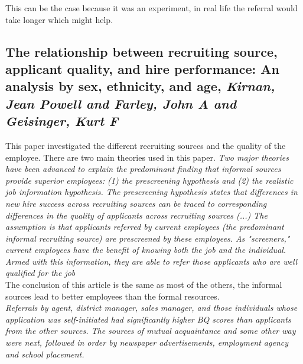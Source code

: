\documentclass[a4paper, 11pt]{article} %
\begin{document}
This can be the case because it was an experiment, in real life the referral would take longer which might help.


\subsection*{The relationship between recruiting source, applicant quality, and hire performance: An analysis by sex, ethnicity, and age, 
\emph{Kirnan, Jean Powell and Farley, John A and Geisinger, Kurt F} \cite{tenth}}

This paper investigated the different recruiting sources and the quality of the employee. 
There are two main theories used in this paper.
\emph{Two major theories have been advanced to explain the predominant
finding that informal sources provide superior employees: (1) the prescreening hypothesis and (2) the realistic job information hypothesis. The
prescreening hypothesis states that differences in new hire success across
recruiting sources can be traced to corresponding differences in the quality
of applicants across recruiting sources (...) The assumption is that applicants referred by current employees (the predominant informal recruiting source) are prescreened by these
employees. As "screeners," current employees have the benefit of knowing
both the job and the individual. Armed with this information, they are able
to refer those applicants who are well qualified for the job}\\

The conclusion of this article is the same as most of the others, the informal sources lead to better employees than the formal resources.\\

\emph{Referrals by agent, district manager, sales manager,
and those individuals whose application was self-initiated had significantly
higher BQ scores than applicants from the other sources. The sources
of mutual acquaintance and some other way were next, followed in order
by newspaper advertisements, employment agency and school placement.}\\
\end{document}
